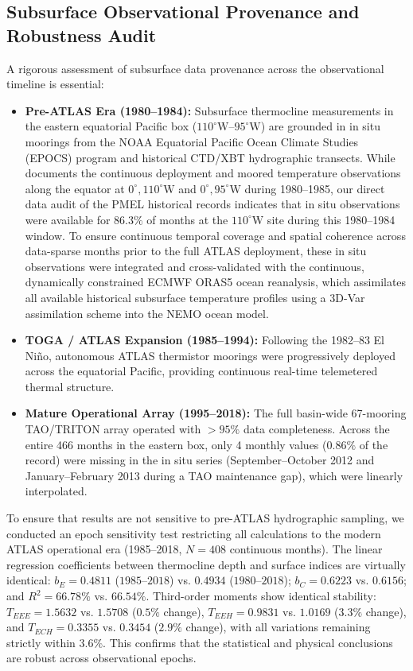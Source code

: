 \documentclass[11pt,a4paper]{article}
\begin{document}
\subsection{Subsurface Observational Provenance and Robustness Audit}
A rigorous assessment of subsurface data provenance across the observational timeline is essential:
\begin{itemize}
    \item \textbf{Pre-ATLAS Era (1980--1984):} Subsurface thermocline measurements in the eastern equatorial Pacific box ($110^\circ\text{W}$--$95^\circ\text{W}$) are grounded in in situ moorings from the NOAA Equatorial Pacific Ocean Climate Studies (EPOCS) program \citep{halpern1987observations} and historical CTD/XBT hydrographic transects. While \citet{halpern1987observations} documents the continuous deployment and moored temperature observations along the equator at $0^\circ, 110^\circ\text{W}$ and $0^\circ, 95^\circ\text{W}$ during 1980--1985, our direct data audit of the PMEL historical records indicates that in situ observations were available for $86.3\%$ of months at the $110^\circ\text{W}$ site during this 1980--1984 window. To ensure continuous temporal coverage and spatial coherence across data-sparse months prior to the full ATLAS deployment, these in situ observations were integrated and cross-validated with the continuous, dynamically constrained ECMWF ORAS5 ocean reanalysis, which assimilates all available historical subsurface temperature profiles using a 3D-Var assimilation scheme into the NEMO ocean model.
    \item \textbf{TOGA / ATLAS Expansion (1985--1994):} Following the 1982--83 El Ni\~no, autonomous ATLAS thermistor moorings were progressively deployed across the equatorial Pacific, providing continuous real-time telemetered thermal structure.
    \item \textbf{Mature Operational Array (1995--2018):} The full basin-wide 67-mooring TAO/TRITON array operated with $>95\%$ data completeness. Across the entire 466 months in the eastern box, only 4 monthly values ($0.86\%$ of the record) were missing in the in situ series (September--October 2012 and January--February 2013 during a TAO maintenance gap), which were linearly interpolated.
\end{itemize}

To ensure that results are not sensitive to pre-ATLAS hydrographic sampling, we conducted an epoch sensitivity test restricting all calculations to the modern ATLAS operational era (1985--2018, $N = 408$ continuous months). The linear regression coefficients between thermocline depth and surface indices are virtually identical: $b_E = 0.4811$ ($1985$--$2018$) vs. $0.4934$ ($1980$--$2018$); $b_C = 0.6223$ vs. $0.6156$; and $R^2 = 66.78\%$ vs. $66.54\%$. Third-order moments show identical stability: $T_{EEE} = 1.5632$ vs. $1.5708$ ($0.5\%$ change), $T_{EEH} = 0.9831$ vs. $1.0169$ ($3.3\%$ change), and $T_{ECH} = 0.3355$ vs. $0.3454$ ($2.9\%$ change), with all variations remaining strictly within $3.6\%$. This confirms that the statistical and physical conclusions are robust across observational epochs.
\end{document}
